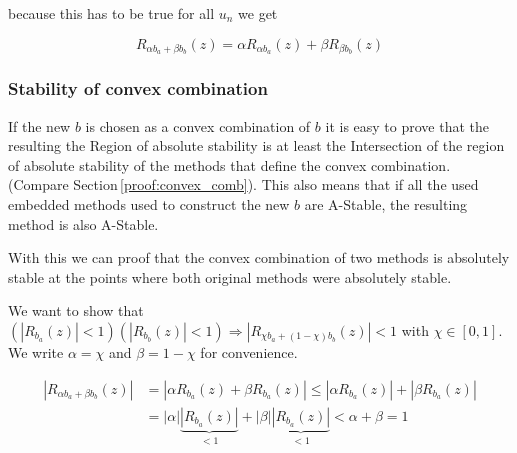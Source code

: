 \documentclass{article}
\begin{document}
because this has to be true for all $u_n$ we get

\begin{equation}
R_{\alpha b_a+\beta b_b}(z) = \alpha R_{\alpha b_a}(z) + \beta R_{\beta b_b}(z) 
\end{equation}





\subsubsection{Stability of convex combination}
If the new $b$ is chosen as a convex combination of $b$ it is easy to prove that the resulting  the Region of absolute stability is at least the Intersection of the region of absolute stability of the methods that define the convex combination. (Compare Section\,\ref{proof:convex_comb}). This also means that if all the used embedded methods used to construct the new $b$ are A-Stable, the resulting method is also A-Stable.

With this we can proof that the convex combination of two methods is absolutely stable at the points where both original methods were absolutely stable.

We want to show that $(|R_{b_a}(z)|  < 1) (|R_{b_b}(z)| < 1) \Rightarrow |R_{\chi b_a +(1- \chi) b_b}(z)| < 1$ with $\chi \in [0,1]$.
We write $\alpha = \chi$ and $\beta = 1-\chi$ for convenience.

\begin{align}
|R_{\alpha b_a +\beta b_b}(z)| &= |\alpha R_{b_a}(z) + \beta R_{b_a}(z)| \leq |\alpha R_{b_a}(z)| + |\beta R_{b_a}(z)|\\
 &=| \alpha| \underbrace{|R_{b_a}(z)|}_{<1} + |\beta| \underbrace{|R_{b_a}(z)|}_{<1} < \alpha + \beta = 1
\end{align}
\end{document}
